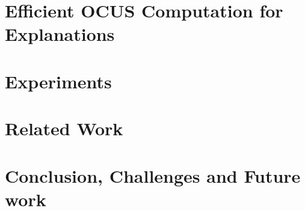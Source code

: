 \documentclass{article}
\begin{document}
\section{Efficient OCUS Computation for Explanations}\label{sec:ocusEx}


\section{Experiments}\label{sec:experiments}


\section{Related Work}\label{sec:related}


\section{Conclusion, Challenges and Future work}\label{sec:conclusion}


{
\footnotesize

 
}
     
\end{document}
